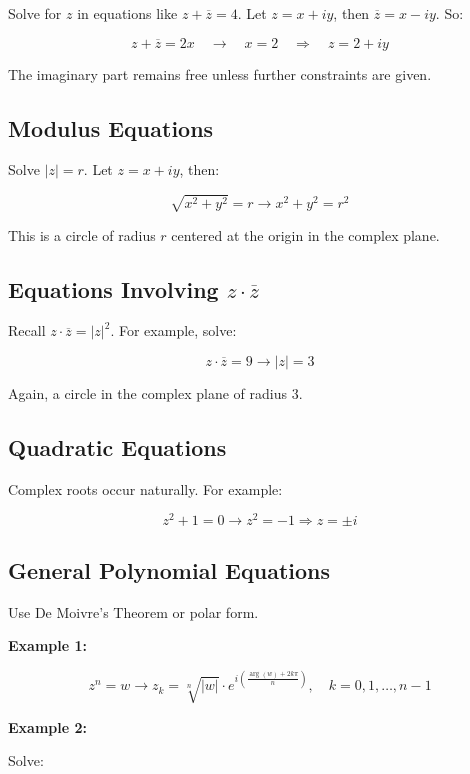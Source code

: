 Solve for \(z\) in equations like \( z + \overline{z} = 4 \).
Let \( z = x + iy \), then \( \overline{z} = x - iy \). So:
	      
\[
	z + \overline{z} = 2x \quad \to \quad x = 2 \quad \Rightarrow \quad z = 2 + iy
\]
	      
The imaginary part remains free unless further constraints are given.

\subsection{Modulus Equations}

Solve \( |z| = r \). Let \( z = x + iy \), then:
	      
\[
	\sqrt{x^2 + y^2} = r \to x^2 + y^2 = r^2
\]

This is a circle of radius \( r \) centered at the origin in the complex plane.

\subsection{Equations Involving \texorpdfstring{\( z \cdot \overline{z} \)}{}}

Recall \( z \cdot \overline{z} = |z|^2 \). For example, solve:
	      
\[
	z \cdot \overline{z} = 9 \to |z| = 3
\]

Again, a circle in the complex plane of radius 3.

\subsection{Quadratic Equations}

Complex roots occur naturally. For example:

\[
	z^2 + 1 = 0 \to z^2 = -1 \Rightarrow z = \pm i
\]

\subsection{General Polynomial Equations}

 Use De Moivre’s Theorem or polar form. 
 
 \textbf{Example 1:}
	      
\[
	z^n = w \to z_k = \sqrt[n]{|w|} \cdot e^{i\left( \frac{\arg(w) + 2k\pi}{n} \right)}, \quad k = 0, 1, 
	\dots, n-1
\]

\textbf{Example 2:}

Solve:

